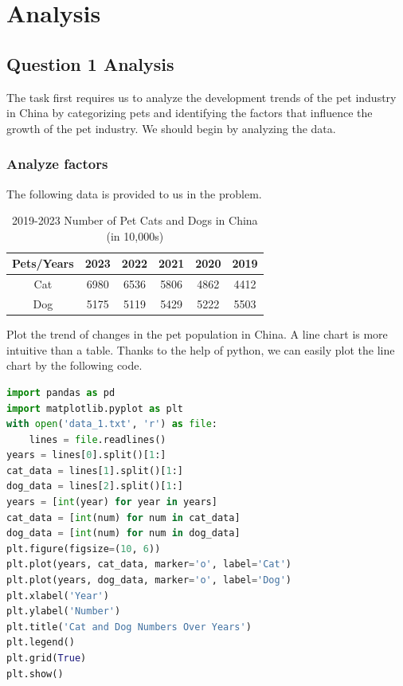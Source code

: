 \documentclass[withoutpreface,bwprint]{cumcmthesis} %
\begin{document}
\section{Analysis}

\subsection{Question 1 Analysis}

The task first requires us to analyze the development trends of the pet industry in China by categorizing pets 
and identifying the factors that influence the growth of the pet industry.
We should begin by analyzing the data.
\subsubsection{Analyze factors}
\par The following data is provided to us in the problem.
\begin{table}[!htbp]
    \caption{2019-2023 Number of Pet Cats and Dogs in China (in 10,000s)} \centering
    \begin{tabular}{cccccc}
    \toprule[1.5pt]
    Pets/Years & 2023 & 2022 & 2021 & 2020 & 2019 \\
    \midrule[1pt]
    Cat & 6980 & 6536 & 5806 & 4862 & 4412 \\
    Dog & 5175 & 5119 & 5429 & 5222 & 5503 \\
    \bottomrule[1.5pt]
    \end{tabular}
    \end{table}
\par Plot the trend of changes in the pet population in China. 
A line chart is more intuitive than a table.
Thanks to the help of python, we can easily plot the line chart by the following code.
\begin{lstlisting}[language=python]
import pandas as pd
import matplotlib.pyplot as plt
with open('data_1.txt', 'r') as file:
    lines = file.readlines()
years = lines[0].split()[1:]
cat_data = lines[1].split()[1:]
dog_data = lines[2].split()[1:]
years = [int(year) for year in years]
cat_data = [int(num) for num in cat_data]
dog_data = [int(num) for num in dog_data]
plt.figure(figsize=(10, 6))
plt.plot(years, cat_data, marker='o', label='Cat')
plt.plot(years, dog_data, marker='o', label='Dog')
plt.xlabel('Year')
plt.ylabel('Number')
plt.title('Cat and Dog Numbers Over Years')
plt.legend()
plt.grid(True)
plt.show()
\end{lstlisting}
\end{document}
